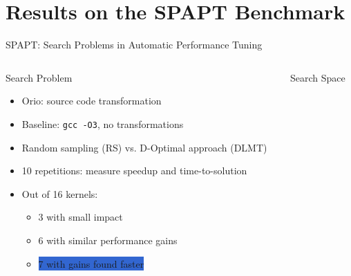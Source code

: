 \documentclass[10pt, compress, aspectratio=169, xcolor={table,usenames,dvipsnames}]{beamer}
\begin{document}
\section{Results on the SPAPT Benchmark}
\label{sec:org733835b}
\begin{frame}[label={sec:org43bdef2},fragile]{SPAPT: Search Problems in Automatic Performance Tuning}
 \begin{columns}
\begin{column}{0.41\columnwidth}
\begin{block}{Search Problem}
\begin{itemize}
\item \alert{Orio}: source code transformation
\item Baseline: \texttt{gcc -O3}, no transformations
\item Random sampling (\alert{RS}) vs. D-Optimal approach (\alert{DLMT})
\item 10 repetitions: measure \alert{speedup} and \alert{time-to-solution}
\item Out of 16 kernels:
\begin{itemize}
\item 3 with small impact
\item 6 with similar performance gains
\item \colorbox{Highlight}{7 with \alert{gains found faster}}
\end{itemize}
\end{itemize}
\end{block}
\end{column}
\begin{column}{0.59\columnwidth}
\begin{block}{Search Space}
\vspace{-0.4cm}


\end{block}
\end{column}
\end{columns}
\end{frame}
\end{document}
